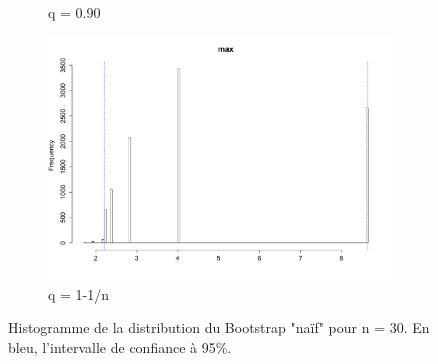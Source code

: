 \documentclass{article}
\renewcommand*{\(}{\left(}
\renewcommand*{\)}{\right)}
\begin{document}
\begin{figure}[H]
\begin{subfigure}[b]{0.3\textwidth}
        \caption{q = 0.90}
        \label{naifB90}
    \end{subfigure}%
    \begin{subfigure}[b]{0.3\textwidth}
        \includegraphics[width = \linewidth]{img/BootstrapNaif-Max-30.pdf}
        \caption{q = 1-1/n}
        \label{fig:naifBMax}
    \end{subfigure}%
    \caption{Histogramme de la distribution du Bootstrap "naïf" pour n = 30. En bleu, l'intervalle de confiance à 95\%.}
    \label{fig:naifB}
\end{figure}
\end{document}
